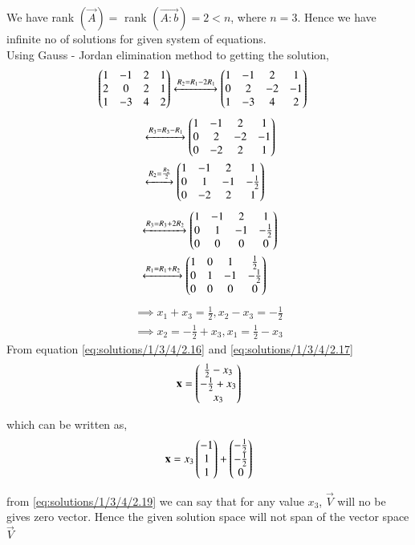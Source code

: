 We have rank $\left( \vec{A} \right) = $  rank $\left( \vec{A:b}\right) = 2 < n $, where $n = 3. $ Hence we have infinite no of solutions for given system of equations.\\
Using Gauss - Jordan elimination method to getting the solution,
\begin{align}
\begin{pmatrix}1&-1& 2 & 1 \\ 2& 0 & 2 & 1 \\ 1 & -3 & 4 & 2 \end{pmatrix} &\xleftrightarrow{R_2=R_1 - 2R_1}\begin{pmatrix}1&-1&2 & 1  \\ 0 &2 & -2 & -1 \\ 1 &-3 & 4 & 2\end{pmatrix}
\end{align}
\begin{align}
&\xleftrightarrow{R_3=R_3 -R_1}\begin{pmatrix}1 &-1&2 & 1\\0 &2 &-2 &-1 \\ 0 & -2 & 2 & 1\end{pmatrix} \\
&\xleftrightarrow{R_2= \frac{R_2}{2}}\begin{pmatrix}1 &-1&2 & 1 \\ 0 & 1 & -1 & -\frac{1}{2} \\ 0 & -2 & 2 & 1\end{pmatrix} 
\end{align}
\begin{align}
&\xleftrightarrow{R_3 = R_3 +2R_2}\begin{pmatrix}1 &-1&2 & 1 \\ 0 & 1 & -1 & -\frac{1}{2} \\ 0 & 0 & 0 & 0\end{pmatrix} \\ 
&\xleftrightarrow {R_1 = R_1 + R_2}\begin{pmatrix}1 & 0 & 1 & \frac{1}{2} \\ 0 & 1 & -1 & -\frac{1}{2} \\ 0 & 0 & 0 & 0\end{pmatrix}
\end{align}
\begin{align}
\implies x_1 +x_3 = \frac{1}{2}, x_2 - x_3 = - \frac{1}{2} \label{eq:solutions/1/3/4/2.16}\\
\implies x_2 = - \frac{1}{2} +x_3 , x_1 = \frac{1}{2} - x_3 \label{eq:solutions/1/3/4/2.17}
\end{align}
From  equation \eqref{eq:solutions/1/3/4/2.16} and \eqref{eq:solutions/1/3/4/2.17}
\begin{align}
\mathbf{x} = \begin{pmatrix}\frac{1}{2} - x_3 \\ -\frac{1}{2} + x_3 \\ x_3 \end{pmatrix}
\end{align}

which can be written as,
\begin{align}
\mathbf{x}=x_3\begin{pmatrix}-1 \\1\\1\end{pmatrix} + \begin{pmatrix}-\frac{1}{2} \\ -\frac{1}{2}\\ 0\end{pmatrix} \label{eq:solutions/1/3/4/2.19}
\end{align}

from \ref{eq:solutions/1/3/4/2.19} we can say that for any value $x_3$, $\vec{V}$ will no be gives zero vector. Hence the given solution space will not span of  the vector space $\vec{V}$



